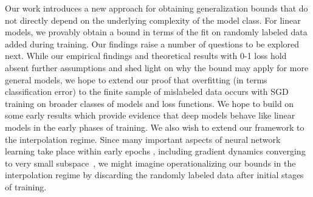 % 
% 
Our work introduces a new approach 
for obtaining generalization bounds
that do not directly depend on the 
underlying complexity of the model class. 
For linear models, we provably obtain a bound 
in terms of the fit on randomly labeled data added during training. 
Our findings raise a number of questions to be explored next. 
While our empirical findings and theoretical results with 0-1 loss 
hold absent further assumptions
and shed light on why the bound 
may apply for more general models,
we hope to extend our proof 
that overfitting (in terms classification error)
to the finite sample of mislabeled data
occurs with SGD training on broader classes 
of models and loss functions. 
We hope to build on some early results
\citep{nakkiran2019sgd, hu2020surprising} 
which provide evidence that deep models
behave like linear models 
in the early phases of training.  
We also wish to extend our framework
to the interpolation regime.
Since many important aspects of neural network learning 
take place within early epochs
\citep{achille2017critical,frankle2020early},
including gradient dynamics converging 
to very small subspace~\citep{gur2018gradient},
we might imagine operationalizing our bounds
in the interpolation regime
by discarding the randomly labeled data
after initial stages of training. 
 



% 
% 

